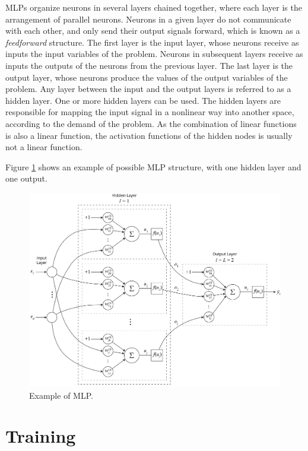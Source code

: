 MLPs organize neurons in several layers chained together, where each layer is the arrangement of parallel neurons. Neurons in a given layer do not communicate with each other, and only send their output signals forward, which is known as a \textit{feedforward} structure. The first layer is the input layer, whose neurons receive as inputs the input variables of the problem. Neurons in subsequent layers receive as inputs the outputs of the neurons from the previous layer. The last layer is the output layer, whose neurons produce the values of the output variables of the problem. Any layer between the input and the output layers is referred to as a hidden layer. One or more hidden layers can be used.  The hidden layers are responsible for mapping the input signal in a nonlinear way into another space, according to the demand of the problem. As the combination of linear functions is also a linear function, the activation functions of the hidden nodes is usually not a linear function.


Figure \ref{fig:mlp} shows an example of possible MLP structure, with one hidden layer and one output.

\begin{figure}[h!]
    \centering
    \includegraphics[width=1\textwidth]{"Part 3 - Learning Systems/Supervised Learning/Multilayer Perceptron/figures/MLP_v2@4x.png"}
    \caption{Example of MLP.}
    \label{fig:mlp}
\end{figure}

\section{Training}
\label{ssec:treino}


